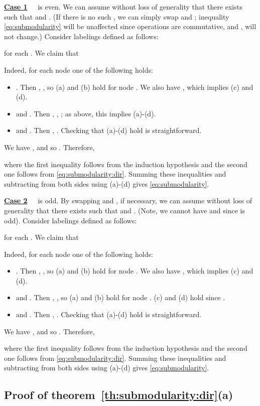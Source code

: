 \documentclass[11pt,onecolumn]{article}
\newcommand{\myparagraph}[1]{{\vspace*{2pt}\noindent\bf{#1}~~}}
\begin{document}
\myparagraph{\underline{Case 1}}  is even.
We can assume without loss of generality that there exists  such that  and
.
(If there is no such , we can simply swap  and ; inequality \eqref{eq:submodularity}
will be unaffected since operations  are commutative, and ,  will not change.)
Consider labelings  defined as follows:

for each . We claim that

Indeed, for each node  one of the following holds:
\begin{itemize}
\item[] . Then , , so (a) and (b) hold for node .
We also have ,
which implies (c) and (d). 
\item[]  and . Then , , 
; as above, this implies (a)-(d). 
\item[]  and . Then , .
Checking that (a)-(d) hold is straightforward.
\end{itemize}
We have , and so . Therefore, 

where the first inequality follows from the induction hypothesis and the second one follows from \eqref{eq:submodularity:dir}.
Summing these inequalities and subtracting  from both sides using (a)-(d) gives \eqref{eq:submodularity}.

\myparagraph{\underline{Case 2}}  is odd.
By swapping  and , if necessary, we can assume without loss of generality that there exists  such that  and
. (Note, we cannot have  and  since  is odd).
Consider labelings  defined as follows:

for each . We claim that

Indeed, for each node  one of the following holds:
\begin{itemize}
\item[] . Then , , so (a) and (b) hold for node .
We also have ,
which implies (c) and (d).
\item[]  and . Then , ,
so (a) and (b) hold for node .
(c) and (d) hold since .
\item[]  and . Then ,
.
Checking that (a)-(d) hold is straightforward.
\end{itemize}
We have , and so . Therefore, 

where the first inequality follows from the induction hypothesis and the second one follows from \eqref{eq:submodularity:dir}.
Summing these inequalities and subtracting  from both sides using (a)-(d) gives \eqref{eq:submodularity}.


\subsection{Proof of theorem~\ref{th:submodularity:dir}(a)}\label{ref:proof:parta}
\end{document}
